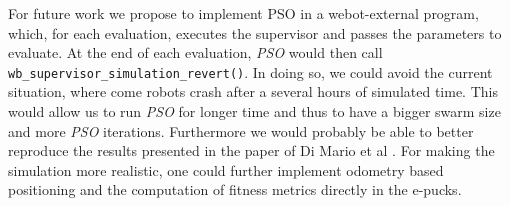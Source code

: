 \documentclass[journal]{IEEEtran}
\begin{document}
For future work we propose to implement PSO in a webot-external program, 
which, for each evaluation, executes the supervisor and passes the 
parameters to evaluate. At the end of each evaluation, \textit{PSO} would 
then call \texttt{wb\_supervisor\_simulation\_revert()}. In doing so, we 
could avoid the current situation, where come robots crash after a several 
hours of simulated time. This would allow us to run \textit{PSO} for longer 
time and thus to have a bigger swarm size and more \textit{PSO} iterations.
Furthermore we would probably be able to better reproduce the results 
presented in the paper of Di Mario et al 
\cite{IEEEhowto:martinoli_pso_noise_2}.
For making the simulation more realistic, one could further implement 
odometry based positioning and the computation of fitness metrics directly 
in the e-pucks.





%



\ifCLASSOPTIONcaptionsoff
  \newpage
\fi



\end{document}
